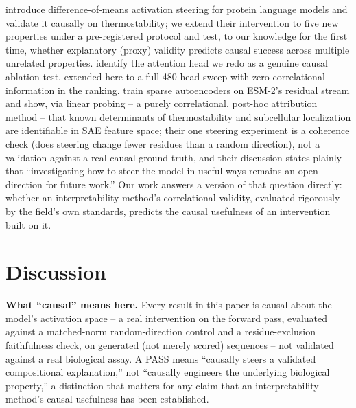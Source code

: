 \documentclass{article}
\begin{document}
\citet{huang2025steering} introduce difference-of-means activation
steering for protein language models and validate it causally on
thermostability; we extend their intervention to five new properties
under a pre-registered protocol and test, to our knowledge for the first
time, whether explanatory (proxy) validity predicts causal success across
multiple unrelated properties. \citet{vig2021bertology} identify the
attention head we redo as a genuine causal ablation test, extended here
to a full 480-head sweep with zero correlational information in the
ranking. \citet{adams2025mechanistic} train sparse autoencoders on
ESM-2's residual stream and show, via linear probing -- a purely
correlational, post-hoc attribution method -- that known determinants of
thermostability and subcellular localization are identifiable in SAE
feature space; their one steering experiment is a coherence check (does
steering change fewer residues than a random direction), not a validation
against a real causal ground truth, and their discussion states plainly
that ``investigating how to steer the model in useful ways remains an
open direction for future work.'' Our work answers a version of that
question directly: whether an interpretability method's correlational
validity, evaluated rigorously by the field's own standards, predicts the
causal usefulness of an intervention built on it.

\section{Discussion}

\textbf{What ``causal'' means here.} Every result in this paper is
causal about the model's activation space -- a real intervention on the
forward pass, evaluated against a matched-norm random-direction control
and a residue-exclusion faithfulness check, on generated (not merely
scored) sequences -- not validated against a real biological assay. A
PASS means ``causally steers a validated compositional explanation,'' not
``causally engineers the underlying biological property,'' a distinction
that matters for any claim that an interpretability method's causal
usefulness has been established.
\end{document}
